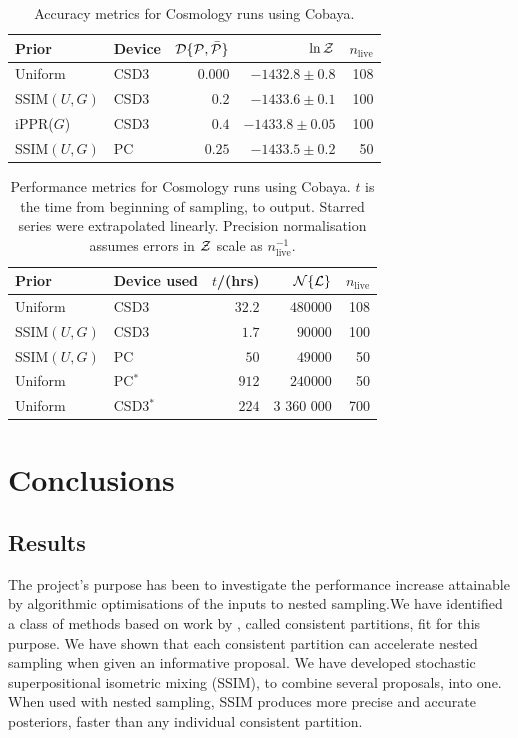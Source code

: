 \documentclass[draft,usenatbib]{mnras}
\begin{document}
\begin{table}
\centering
\caption{Accuracy metrics for Cosmology runs using Cobaya.}
\begin{tabular}{llrrr}
\textbf{Prior} & \textbf{Device} & ${\cal D}\{ {\cal P}, \bar{\cal P}\}$ & $\ln {\cal Z}$ & $n_\text{live}$\\
\hline
Uniform & CSD3 &\( 0.000\) & \(-1432.8 \pm 0.8\) & 108\\
SSIM\((U, G)\) & CSD3 & \(0.2\) & \(-1433.6 \pm 0.1\) & 100\\
iPPR(\(G\)) & CSD3 & \(0.4\) & \(-1433.8 \pm 0.05\) & 100\\
SSIM\((U, G)\) & PC & \(0.25\) & \(-1433.5 \pm 0.2\) & 50
\end{tabular}
\label{tab:cosmo-accuracy}
\end{table}


\begin{table}
\centering
\caption{Performance metrics for Cosmology runs using Cobaya. $t$ is
the time from beginning of sampling, to output. Starred series
were extrapolated linearly. Precision normalisation assumes errors in
${\cal Z}$ scale as $n_\text{live}^{-1}$. }
\begin{tabular}{llrrr}
\textbf{Prior} & \textbf{Device used} & \textbf{$t$/(hrs)} & \({\cal N}\{ {\cal L}\}\) & $n_\text{live}$\\
\hline
Uniform & CSD3 &\( 32.2 \) & \(480 000\) & 108\\
SSIM\((U, G)\) & CSD3 & \(1.7\) & \(90 000\) & 100\\
SSIM\((U, G)\) & PC & \(50\) & \(49 000\) & 50\\
\hline
Uniform & PC$^{*}$ & \(912\) & \(240 000\) & 50\\
Uniform & CSD3$^{*}$ &  \(224\) & 3 360 000  & 700
\end{tabular}
\label{tab:cosmo-performance}
\end{table}

\section{Conclusions}
\label{sec:org29806b0}

\subsection{Results}
\label{sec:org68bd148}

The project's purpose has been to investigate the performance increase
attainable by algorithmic optimisations of the inputs to nested
sampling.We have identified a class of methods based on work by
\cite{chen-ferroz-hobson}, called consistent partitions, fit for this
purpose. We have shown that each consistent partition can accelerate
nested sampling when given an informative proposal.  We have developed
stochastic superpositional isometric mixing (SSIM), to combine several
proposals, into one. When used with nested sampling, SSIM produces
more precise and accurate posteriors, faster than any individual
consistent partition.
\end{document}
